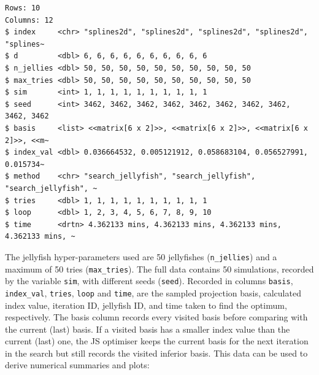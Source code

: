 \documentclass[
  number,
  preprint,
  3p]{elsarticle}
\begin{document}
\begin{verbatim}
Rows: 10
Columns: 12
$ index     <chr> "splines2d", "splines2d", "splines2d", "splines2d", "splines~
$ d         <dbl> 6, 6, 6, 6, 6, 6, 6, 6, 6, 6
$ n_jellies <dbl> 50, 50, 50, 50, 50, 50, 50, 50, 50, 50
$ max_tries <dbl> 50, 50, 50, 50, 50, 50, 50, 50, 50, 50
$ sim       <int> 1, 1, 1, 1, 1, 1, 1, 1, 1, 1
$ seed      <int> 3462, 3462, 3462, 3462, 3462, 3462, 3462, 3462, 3462, 3462
$ basis     <list> <<matrix[6 x 2]>>, <<matrix[6 x 2]>>, <<matrix[6 x 2]>>, <<m~
$ index_val <dbl> 0.036664532, 0.005121912, 0.058683104, 0.056527991, 0.015734~
$ method    <chr> "search_jellyfish", "search_jellyfish", "search_jellyfish", ~
$ tries     <dbl> 1, 1, 1, 1, 1, 1, 1, 1, 1, 1
$ loop      <dbl> 1, 2, 3, 4, 5, 6, 7, 8, 9, 10
$ time      <drtn> 4.362133 mins, 4.362133 mins, 4.362133 mins, 4.362133 mins, ~
\end{verbatim}

The jellyfish hyper-parameters used are 50 jellyfishes
(\texttt{n\_jellies}) and a maximum of 50 tries (\texttt{max\_tries}).
The full data contains 50 simulations, recorded by the variable
\texttt{sim}, with different seeds (\texttt{seed}). Recorded in columns
\texttt{basis}, \texttt{index\_val}, \texttt{tries}, \texttt{loop} and
\texttt{time}, are the sampled projection basis, calculated index value,
iteration ID, jellyfish ID, and time taken to find the optimum,
respectively. The basis column records every visited basis before
comparing with the current (last) basis. If a visited basis has a
smaller index value than the current (last) one, the JS optimiser keeps
the current basis for the next iteration in the search but still records
the visited inferior basis. This data can be used to derive numerical
summaries and plots:
\end{document}
